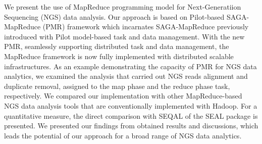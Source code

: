 \documentclass{sig-alternate}
\begin{document}
\maketitle
\begin{abstract} 



 
\end{abstract}

We present the use of MapReduce programming model for Next-Generatiion Sequencing (NGS) data analysis.  Our approach is based on Pilot-based SAGA-MapReduce (PMR) framework which incarnates SAGA-MapReduce previously introduced with Pilot model-based task and data management.  With the new PMR, seamlessly supporting distributed task and data management, the MapReduce framework is now fully implemented with distributed scalable infrastructures.  As an example demonstrating the capacity of PMR for NGS data analytics, we examined the analysis that carried out NGS reads alignment and duplicate removal, assigned to the map phase and the reduce phase task, respectively.  We compared our implementation with other MapReduce-based NGS data analysis tools that are conventionally implemented with Hadoop.  For a quantitative measure, the direct comparison with SEQAL of the SEAL package is presented.   We presented our findings from obtained results and discussions, which leads the potential of our approach for a broad range of NGS data analytics. 


 





\end{document}
